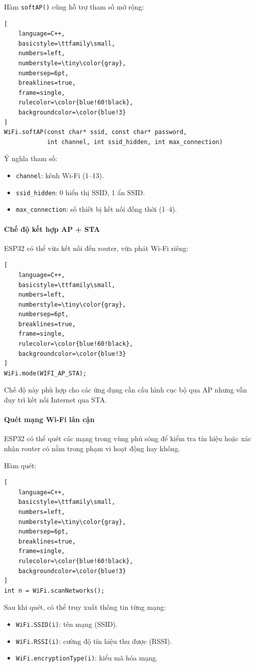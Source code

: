 Hàm \texttt{softAP()} cũng hỗ trợ tham số mở rộng:
\begin{lstlisting}[
	language=C++,
	basicstyle=\ttfamily\small,
	numbers=left,
	numberstyle=\tiny\color{gray},
	numbersep=6pt,
	breaklines=true,
	frame=single,
	rulecolor=\color{blue!60!black},
	backgroundcolor=\color{blue!3}
]
WiFi.softAP(const char* ssid, const char* password,
			int channel, int ssid_hidden, int max_connection)
\end{lstlisting}

Ý nghĩa tham số:
\begin{itemize}
	\item \texttt{channel}: kênh Wi-Fi (1--13).
	\item \texttt{ssid\_hidden}: 0 hiển thị SSID, 1 ẩn SSID.
	\item \texttt{max\_connection}: số thiết bị kết nối đồng thời (1--4).
\end{itemize}

\paragraph{Chế độ kết hợp AP + STA}
ESP32 có thể vừa kết nối đến router, vừa phát Wi-Fi riêng:
\begin{lstlisting}[
	language=C++,
	basicstyle=\ttfamily\small,
	numbers=left,
	numberstyle=\tiny\color{gray},
	numbersep=6pt,
	breaklines=true,
	frame=single,
	rulecolor=\color{blue!60!black},
	backgroundcolor=\color{blue!3}
]
WiFi.mode(WIFI_AP_STA);
\end{lstlisting}
Chế độ này phù hợp cho các ứng dụng cần cấu hình cục bộ qua AP nhưng vẫn duy trì kết nối Internet qua STA.

\paragraph{Quét mạng Wi-Fi lân cận}
ESP32 có thể quét các mạng trong vùng phủ sóng để kiểm tra tín hiệu hoặc xác nhận router có nằm trong phạm vi hoạt động hay không.

Hàm quét:
\begin{lstlisting}[
	language=C++,
	basicstyle=\ttfamily\small,
	numbers=left,
	numberstyle=\tiny\color{gray},
	numbersep=6pt,
	breaklines=true,
	frame=single,
	rulecolor=\color{blue!60!black},
	backgroundcolor=\color{blue!3}
]
int n = WiFi.scanNetworks();
\end{lstlisting}

Sau khi quét, có thể truy xuất thông tin từng mạng:
\begin{itemize}
	\item \texttt{WiFi.SSID(i)}: tên mạng (SSID).
	\item \texttt{WiFi.RSSI(i)}: cường độ tín hiệu thu được (RSSI).
	\item \texttt{WiFi.encryptionType(i)}: kiểu mã hóa mạng.
\end{itemize}

